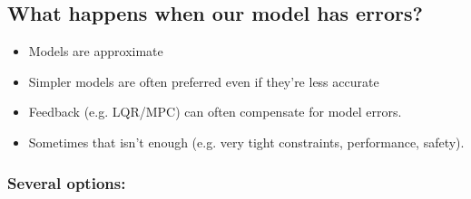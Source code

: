 \documentclass[11pt]{article}
\begin{document}
\subsection*{What happens when our model has errors?}
\begin{itemize}
    \item Models are approximate 
    \item Simpler models are often preferred even if they're less accurate
    \item Feedback (e.g. LQR/MPC) can often compensate for model errors.
    \item Sometimes that isn't enough (e.g. very tight constraints, performance, safety).
\end{itemize}
    \subsubsection*{Several options:}
\end{document}

